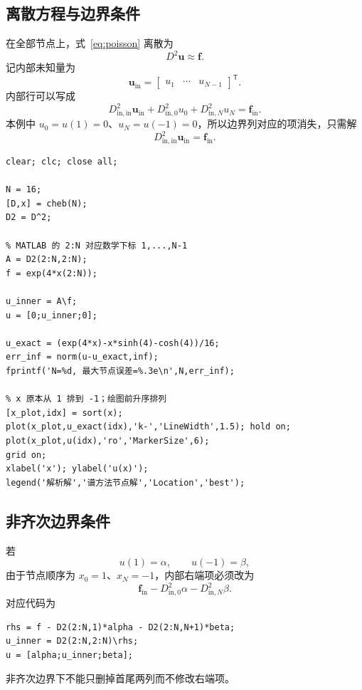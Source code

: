 \documentclass[11pt,a4paper]{ctexart}
\numberwithin{equation}{section}
\newcommand{\vect}[1]{\bm{#1}}
\begin{document}
\subsection{离散方程与边界条件}

在全部节点上，式~\eqref{eq:poisson} 离散为
\begin{equation}
  D^2\vect{u}\approx\vect{f}.
\end{equation}
记内部未知量为
\begin{equation}
  \vect{u}_{\mathrm{in}}=
  \begin{bmatrix}u_1&\cdots&u_{N-1}\end{bmatrix}^{\mathsf T}.
\end{equation}
内部行可以写成
\begin{equation}
  D^2_{\mathrm{in},\mathrm{in}}\vect{u}_{\mathrm{in}}
  +D^2_{\mathrm{in},0}u_0
  +D^2_{\mathrm{in},N}u_N
  =\vect{f}_{\mathrm{in}}.
\end{equation}
本例中 $u_0=u(1)=0$、$u_N=u(-1)=0$，所以边界列对应的项消失，只需解
\begin{equation}
  D^2_{\mathrm{in},\mathrm{in}}\vect{u}_{\mathrm{in}}
  =\vect{f}_{\mathrm{in}}.
\end{equation}

\begin{lstlisting}[caption={Poisson 边值问题求解程序}]
clear; clc; close all;

N = 16;
[D,x] = cheb(N);
D2 = D^2;

% MATLAB 的 2:N 对应数学下标 1,...,N-1
A = D2(2:N,2:N);
f = exp(4*x(2:N));

u_inner = A\f;
u = [0;u_inner;0];

u_exact = (exp(4*x)-x*sinh(4)-cosh(4))/16;
err_inf = norm(u-u_exact,inf);
fprintf('N=%d, 最大节点误差=%.3e\n',N,err_inf);

% x 原本从 1 排到 -1；绘图前升序排列
[x_plot,idx] = sort(x);
plot(x_plot,u_exact(idx),'k-','LineWidth',1.5); hold on;
plot(x_plot,u(idx),'ro','MarkerSize',6);
grid on;
xlabel('x'); ylabel('u(x)');
legend('解析解','谱方法节点解','Location','best');
\end{lstlisting}

\subsection{非齐次边界条件}

若
\begin{equation}
  u(1)=\alpha,\qquad u(-1)=\beta,
\end{equation}
由于节点顺序为 $x_0=1$、$x_N=-1$，内部右端项必须改为
\begin{equation}
  \vect{f}_{\mathrm{in}}
  -D^2_{\mathrm{in},0}\alpha
  -D^2_{\mathrm{in},N}\beta.
\end{equation}
对应代码为
\begin{lstlisting}
rhs = f - D2(2:N,1)*alpha - D2(2:N,N+1)*beta;
u_inner = D2(2:N,2:N)\rhs;
u = [alpha;u_inner;beta];
\end{lstlisting}
非齐次边界下不能只删掉首尾两列而不修改右端项。
\end{document}
